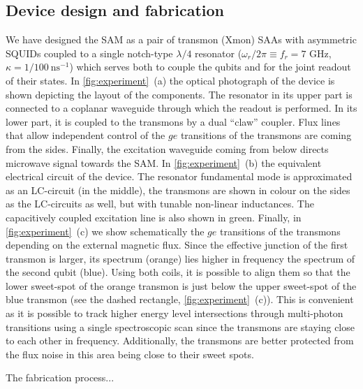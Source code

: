 \documentclass[%
 aip,
 amsmath,amssymb,
 reprint,%
]{revtex4-1}
\begin{document}
\subsection{Device design and fabrication}
We have designed the SAM as a pair of transmon (Xmon\cite{barends2013coherent}) SAAs with asymmetric SQUIDs\cite{hutchings2017tunable} coupled to a single notch-type\cite{probst2015efficient} $\lambda/4$ resonator ($\omega_r/2\pi \equiv f_r = 7$ GHz, $\kappa = 1/100\ \text{ns}^{-1}$) which serves both to couple\cite{majer2007coupling} the qubits and for the joint\cite{chow2010detecting} readout of their states. In \autoref{fig:experiment}~(a) the optical photograph of the device is shown depicting the layout of the components. The resonator in its upper part is connected to a coplanar waveguide through which the readout is performed. In its lower part, it is coupled to the transmons by a dual ``claw''\cite{barends2013coherent} coupler. Flux lines that allow independent control of the $ge$ transitions of the transmons are coming from the sides. Finally, the excitation waveguide coming from below directs microwave signal towards the SAM. In \autoref{fig:experiment}~(b) the equivalent electrical circuit of the device. The resonator fundamental mode is approximated as an LC-circuit (in the middle), the transmons are shown in colour on the sides as the LC-circuits as well, but with tunable non-linear inductances. The capacitively coupled excitation line is also shown in green. Finally, in \autoref{fig:experiment}~(c) we show schematically the $ge$ transitions of the transmons depending on the external magnetic flux. Since the effective junction of the first transmon is larger, its spectrum (orange) lies higher in frequency the spectrum of the second qubit (blue). Using both coils, it is possible to align them so that the lower sweet-spot of the orange transmon is just below the upper sweet-spot of the blue transmon (see the dashed rectangle,  \autoref{fig:experiment}~(c)). This is convenient as it is possible to track higher energy level intersections through multi-photon transitions using a single spectroscopic scan since the transmons are staying close to each other in frequency. Additionally, the transmons are better protected from the flux noise in this area being close to their sweet spots.

The fabrication process...
\end{document}
